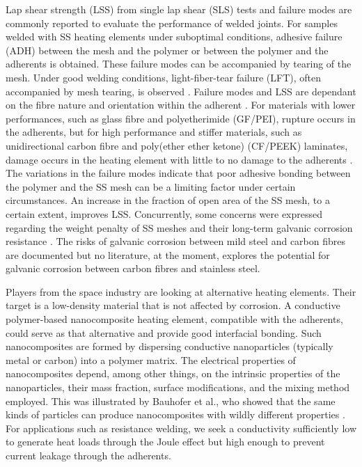 \documentclass[11pt,review,times]{elsarticle}
\begin{document}
Lap shear strength (LSS) from single lap shear (SLS) tests and failure modes are commonly reported to evaluate the performance of welded joints. 
For samples welded with SS heating elements under suboptimal conditions, adhesive failure (ADH) between the mesh and the polymer or between the polymer and the adherents is obtained. 
These failure modes can be accompanied by tearing of the mesh. 
Under good welding conditions, light-fiber-tear failure (LFT), often accompanied by mesh tearing, is observed \cite{Shi2014}. 
Failure modes and LSS are dependant on the fibre nature and orientation within the adherent \cite{Shi2013a}. 
For materials with lower performances, such as glass fibre and polyetherimide (GF/PEI), rupture occurs in the adherents, but for high performance and stiffer materials, such as unidirectional carbon fibre and poly(ether ether ketone) (CF/PEEK) laminates, damage occurs in the heating element with little to no damage to the adherents \cite{Dube2015}. 
The variations in the failure modes indicate that poor adhesive bonding between the polymer and the SS mesh \cite{Dube2007,Dube2012a,Dube2009a,Shi2014,Shi2015a} can be a limiting factor under certain circumstances. 
An increase in the fraction of open area of the SS mesh, to a certain extent, improves LSS. 
Concurrently, some concerns were expressed regarding the weight penalty of SS meshes and their long-term galvanic corrosion resistance \cite{Stavrov2005a}. 
The risks of galvanic corrosion between mild steel and carbon fibres are documented \cite{Tavakkolizadeh2001,Arronche2013} but no literature, at the moment, explores the potential for galvanic corrosion between carbon fibres and stainless steel. 

Players from the space industry are looking at alternative heating elements.  
Their target is a low-density material that is not affected by corrosion. 
A conductive polymer-based nanocomposite heating element, compatible with the adherents, could serve as that alternative and provide good interfacial bonding. 
Such nanocomposites are formed by dispersing conductive nanoparticles (typically metal or carbon) into a polymer matrix. 
The electrical properties of nanocomposites depend, among other things, on the intrinsic properties of the nanoparticles, their mass fraction, surface modifications, and the mixing method employed. 
This was illustrated by Bauhofer et al., who showed that the same kinds of particles can produce nanocomposites with wildly different properties \cite{Bauhofer2009}. 
For applications such as resistance welding, we seek a conductivity sufficiently low to generate heat loads through the Joule effect but high enough to prevent current leakage through the adherents. 
\end{document}
